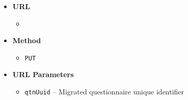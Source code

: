 \begin{itemize}
    \item \textbf{URL}
        \begin{itemize}
            \item {}
        \end{itemize}

    \item \textbf{Method}
        \begin{itemize}
            \item \texttt{PUT}
        \end{itemize}

    \item \textbf{URL Parameters}
        \begin{itemize}
            \item \texttt{qtnUuid} -- Migrated questionnaire unique identifier
        \end{itemize}
\end{itemize}
